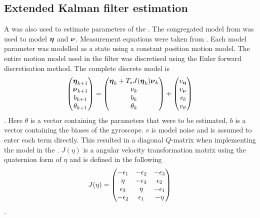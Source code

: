 \subsection{Extended Kalman filter estimation}
A \abbrEKF was also used to estimate parameters of the \abbrROV. The congregated model from  was used to model $\boldsymbol{\eta}$ and $\boldsymbol{\nu}$. Measurement equations were taken from . Each model parameter was modelled as a state using a constant position motion model. The entire motion model used in the filter was discretised using the Euler forward discretisation method. The complete discrete model is
\begin{equation}
\label{eq:motionModelKalman}
\begin{pmatrix}
\boldsymbol{\eta}_{k+1}\\ 
\boldsymbol{\nu}_{k+1}\\
b_{k+1}\\
\theta_{k+1}
\end{pmatrix} = 
\begin{pmatrix}
\boldsymbol{\eta}_k + T_s J(\boldsymbol{\eta}_k)\boldsymbol{\nu}_k\\
\nu_k\\
b_k\\
\theta_k
\end{pmatrix}
+ \begin{pmatrix}
v_{\boldsymbol{\eta}}\\
v_{\boldsymbol{\nu}}\\
v_{b}\\
v_{\theta}
\end{pmatrix}
\end{equation}.
Here $\theta$ is a vector containing the parameters that were to be estimated, $b$ is a vector containing the biases of the gyroscope. $v$ is model noise and is assumed to enter each term directly. This resulted in a diagonal $Q$-matrix when implementing the model in the \abbrEKF. $J(\eta)$ is a angular velocity transformation matrix using the quaternion form of $\eta$ and is defined in the following 
\begin{equation}
J(\eta) = \begin{pmatrix}
-\epsilon_1  & -\epsilon_2  & -\epsilon_3 \\
\eta   & -\epsilon_3 & \epsilon_2   \\
\epsilon_3 & \eta    & -\epsilon_1   \\ 
-\epsilon_2 & \epsilon_1    & -\eta   \\ 
\end{pmatrix}
\end{equation}.
